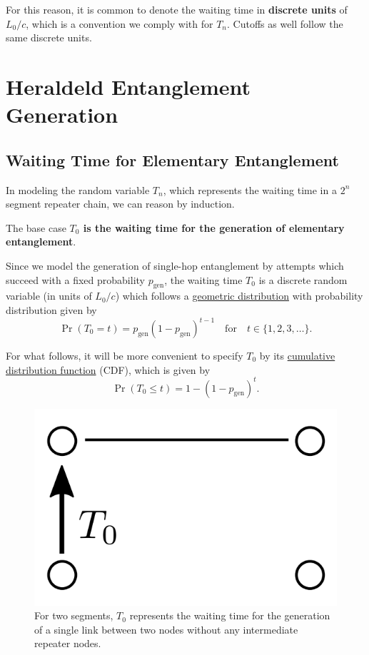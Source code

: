 \documentclass{masterthesis}
\begin{document}
For this reason, it is common to denote the waiting time in \textbf{discrete units} of ${L_0}/{c}$, which is a convention we comply with for $T_n$. Cutoffs as well follow the same discrete units. %

\newpage
\section*{Heraldeld Entanglement Generation}

\subsection*{Waiting Time for Elementary Entanglement}
In modeling the random variable $T_n$, which represents the waiting time in a $2^n$ segment repeater chain, we can reason by induction.

The base case \textbf{$T_0$ is the waiting time for the generation of elementary entanglement}.

Since we model the generation of single-hop entanglement by attempts which succeed with a fixed probability $p_{\text{gen}}$, the waiting time $T_0$ is a discrete random variable (in units of $L_0 /c$) which follows a \hyperref[section:geometric_distribution]{geometric distribution} with probability distribution given by 
\begin{equation}
    \Pr(T_0 = t) = p_{\text{gen}} (1 - p_{\text{gen}})^{t-1} \quad \text{for} \quad t \in \{1, 2, 3, \ldots \}.
\end{equation}

For what follows, it will be more convenient to specify $T_0$ by its \hyperref[subsection:geometric_cdf]{cumulative distribution function} (CDF), which is given by
\begin{equation}
    \Pr(T_0 \leq t) = 1 - (1 - p_{\text{gen}})^t.
\end{equation}

\begin{figure}[h]
    \centering
    \includegraphics[width=0.2\linewidth]{images/gen.png}
    \caption{For two segments, $T_0$ represents the waiting time for the generation of a single link between two nodes without any intermediate repeater nodes.}
    \label{fig:gen}
\end{figure}
\end{document}
